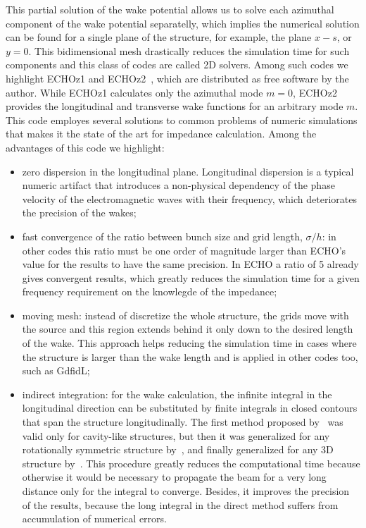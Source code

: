     This partial solution of the wake potential allows us to solve each azimuthal component of the wake potential separatelly, which implies the numerical solution can be found for a single plane of the structure, for example, the plane $x-s$, or $y=0$. This bidimensional mesh drastically reduces the simulation time for such components and this class of codes are called 2D solvers. Among such codes we highlight ECHOz1 and ECHOz2~\cite{Zagorodnov2003, Zagorodnov2005, Zagorodnov2006a}, which are distributed as free software by the author. While ECHOz1 calculates only the azimuthal mode $m=0$, ECHOz2 provides the longitudinal and transverse wake functions for an arbitrary mode $m$.  This code employes several solutions to common problems of numeric simulations that makes it the state of the art for impedance calculation. Among the advantages of this code we highlight:
    \begin{itemize}
	    \item zero dispersion in the longitudinal plane. Longitudinal dispersion is a typical numeric artifact that introduces a non-physical dependency of the phase velocity of the electromagnetic waves with their frequency, which deteriorates the precision of the wakes;
	    \item fast convergence of the ratio between bunch size and grid length, $\sigma/h$: in other codes this ratio must be one order of magnitude larger than ECHO's value for the results to have the same precision. In ECHO a ratio of \SI{5}{} already gives convergent results, which greatly reduces the simulation time for a given frequency requirement on the knowlegde of the impedance;
	    \item moving mesh: instead of discretize the whole structure, the grids move with the source and this region extends behind it only down to the desired length of the wake. This approach helps reducing the simulation time in cases where the structure is larger than the wake length and is applied in other codes too, such as GdfidL;
	    \item indirect integration: for the wake calculation, the infinite integral in the longitudinal direction can be substituted by finite integrals in closed contours that span the structure longitudinally. The first method proposed by~ was valid only for cavity-like structures, but then it was generalized for any rotationally symmetric structure by~, and finally generalized for any 3D structure by~. This procedure greatly reduces the computational time because otherwise it would be necessary to propagate the beam for a very long distance only for the integral to converge. Besides, it improves the precision of the results, because the long integral in the direct method suffers from accumulation of numerical errors.
    \end{itemize}


